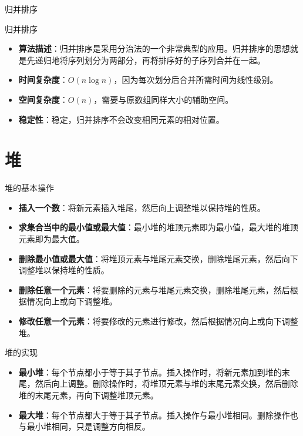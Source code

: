 \documentclass{beamer}
\begin{document}
\begin{frame}{归并排序}
    \begin{block}{归并排序}
        \begin{itemize}
            \item \textbf{算法描述}：归并排序是采用分治法的一个非常典型的应用。归并排序的思想就是先递归地将序列划分为两部分，再将排序好的子序列合并在一起。
            \item \textbf{时间复杂度}：$O(n \log n)$，因为每次划分后合并所需时间为线性级别。
            \item \textbf{空间复杂度}：$O(n)$，需要与原数组同样大小的辅助空间。
            \item \textbf{稳定性}：稳定，归并排序不会改变相同元素的相对位置。
        \end{itemize}
    \end{block}
\end{frame}

\section{堆}

\begin{frame}{堆的基本操作}
    \begin{itemize}
        \item \textbf{插入一个数}：将新元素插入堆尾，然后向上调整堆以保持堆的性质。
        \item \textbf{求集合当中的最小值或最大值}：最小堆的堆顶元素即为最小值，最大堆的堆顶元素即为最大值。
        \item \textbf{删除最小值或最大值}：将堆顶元素与堆尾元素交换，删除堆尾元素，然后向下调整堆以保持堆的性质。
        \item \textbf{删除任意一个元素}：将要删除的元素与堆尾元素交换，删除堆尾元素，然后根据情况向上或向下调整堆。
        \item \textbf{修改任意一个元素}：将要修改的元素进行修改，然后根据情况向上或向下调整堆。
    \end{itemize}
\end{frame}

\begin{frame}{堆的实现}
    \begin{itemize}
        \item \textbf{最小堆}：每个节点都小于等于其子节点。插入操作时，将新元素加到堆的末尾，然后向上调整。删除操作时，将堆顶元素与堆的末尾元素交换，然后删除堆的末尾元素，再向下调整堆顶元素。
        \item \textbf{最大堆}：每个节点都大于等于其子节点。插入操作与最小堆相同。删除操作也与最小堆相同，只是调整方向相反。
    \end{itemize}
\end{frame}
\end{document}
